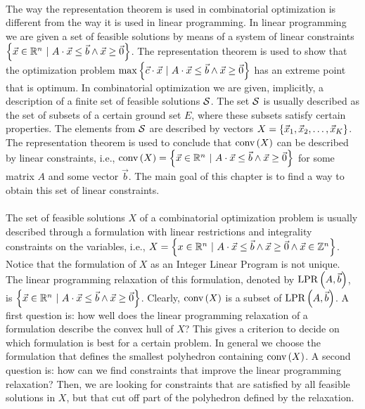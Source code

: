 \paragraph{}
The way the representation theorem is used in combinatorial optimization is different from the way it is used in linear programming. In linear programming we are given a set of feasible solutions by means of a system of linear constraints $\left\{ \vec{x}\in\mathbb{R}^n\ |\ A\cdot\vec{x}\leq\vec{b}\wedge\vec{x}\geq\vec{0} \right\}$. The representation theorem is used to show that the optimization problem $\max\left\{ \vec{c}\cdot\vec{x}\ |\ A\cdot\vec{x}\leq\vec{b}\wedge\vec{x}\geq\vec{0} \right\}$ has an extreme point that is optimum. In combinatorial optimization we are given, implicitly, a description of a finite set of feasible solutions $\mathcal{S}$. The set $\mathcal{S}$ is usually described as the set of subsets of a certain ground set $E$, where these subsets satisfy certain properties. The elements from $\mathcal{S}$ are described by vectors $X=\left\{ \vec{x}_1,\vec{x}_2,\ldots,\vec{x}_K \right\}$. The representation theorem is used to conclude that $\mbox{conv}\left( X \right)$ can be described by linear constraints, i.e., $\mbox{conv}\left( X \right)=\left\{ \vec{x}\in\mathbb{R}^n\ |\ A\cdot\vec{x}\leq\vec{b}\wedge\vec{x}\geq\vec{0} \right\}$ for some matrix $A$ and some vector $\vec{b}$. The main goal of this chapter is to find a way to obtain this set of linear constraints.

\paragraph{}
The set of feasible solutions $X$ of a combinatorial optimization problem is usually described through a formulation with linear restrictions and integrality constraints on the variables, i.e., $X=\left\{ x\in\mathbb{R}^n\ |\ A\cdot\vec{x}\leq\vec{b}\wedge\vec{x}\geq\vec{0}\wedge\vec{x}\in\mathbb{Z}^n \right\}$. Notice that the formulation of $X$ as an Integer Linear Program is not unique. The linear programming relaxation of this formulation, denoted by $\mbox{LPR}\left( A,\vec{b} \right)$, is $\left\{ \vec{x}\in\mathbb{R}^n\ |\ A\cdot\vec{x}\leq\vec{b}\wedge\vec{x}\geq\vec{0} \right\}$. Clearly, $\mbox{conv}\left( X \right)$ is a subset of $\mbox{LPR}\left( A,\vec{b} \right)$. A first question is: how well does the linear programming relaxation of a formulation describe the convex hull of $X$? This gives a criterion to decide on which formulation is best for a certain problem. In general we choose the formulation that defines the smallest polyhedron containing $\mbox{conv}\left( X \right)$. A second question is: how can we find constraints that improve the linear programming relaxation? Then, we are looking for constraints that are satisfied by all feasible solutions in $X$, but that cut off part of the polyhedron defined by the relaxation.

